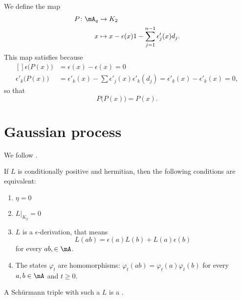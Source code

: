 We define the map
\begin{equation}
    \begin{aligned}
        P\colon \mA_q&\to K_2 \ \\
        x&\mapsto x-\epsilon(x)1-\sum_{j=1}^{n-1}\epsilon'_j(x)d_j.
    \end{aligned}
\end{equation}
This map satisfies because
\begin{equation}
    \begin{aligned}[]
        \epsilon\big( P(x) \big)&=\epsilon(x)-\epsilon(x)=0\\
        \epsilon'_k\big( P(x) \big)&=\epsilon'_k(x)-\sum\epsilon'_j(x)\epsilon'_k(d_j)=\epsilon'_k(x)-\epsilon'_k(x)=0,
    \end{aligned}
\end{equation}
so that
\begin{equation}
    P\big( P(x) \big)=P(x).
\end{equation}



\section{Gaussian process}

We follow \cite{UweLevy}.

\begin{proposition}
    If $L$ is conditionally positive and hermitian, then the following conditions are equivalent:
    \begin{enumerate}
        \item
            $\eta=0$
        \item
            $L|_{K_2}=0$
        \item
            $L$ is a $\epsilon$-derivation, that means
            \begin{equation}
                L(ab)=\epsilon(a)L(b)+L(a)\epsilon(b)
            \end{equation}
            for every $ab,\in\mA$.
        \item
            The states $\varphi_t$ are homomorphisms: $\varphi_t(ab)=\varphi_t(a)\varphi_t(b)$ for every $a,b\in\mA$ and $t\geq 0$.
    \end{enumerate}
\end{proposition}
A Schürmann triple with such a $L$ is a .

